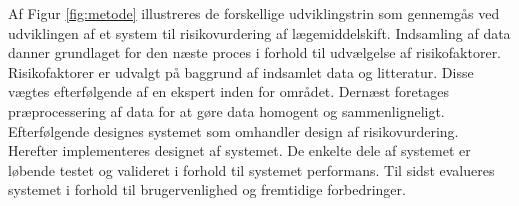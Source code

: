Af Figur \ref{fig:metode} illustreres de forskellige udviklingstrin som gennemgås ved udviklingen af et system til risikovurdering af lægemiddelskift. Indsamling af data danner grundlaget for den næste proces i forhold til udvælgelse af risikofaktorer. Risikofaktorer er udvalgt på baggrund af indsamlet data og litteratur. Disse vægtes efterfølgende af en ekspert inden for området. Dernæst foretages præprocessering af data for at gøre data homogent og sammenligneligt. Efterfølgende designes systemet som omhandler design af risikovurdering. Herefter implementeres designet af systemet. De enkelte dele af systemet er løbende testet og valideret i forhold til systemet performans. Til sidst evalueres systemet i forhold til brugervenlighed og fremtidige forbedringer. 




